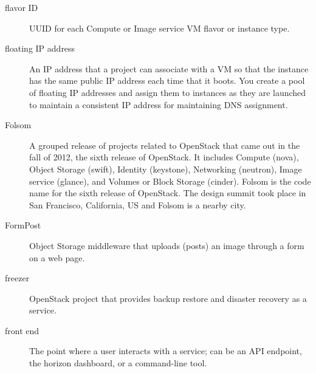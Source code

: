 \documentclass[letterpaper,10pt,english]{sphinxmanual}
\begin{document}
\begin{description}
\item[{flavor ID}] \leavevmode{}\label{_source/glossary:term-flavor-id}
UUID for each Compute or Image service VM flavor or instance
type.

\item[{floating IP address}] \leavevmode{}\label{_source/glossary:term-floating-ip-address}
An IP address that a project can associate with a VM so that the
instance has the same public IP address each time that it boots. You
create a pool of floating IP addresses and assign them to instances as
they are launched to maintain a consistent IP address for maintaining
DNS assignment.

\item[{Folsom}] \leavevmode{}\label{_source/glossary:term-folsom}
A grouped release of projects related to OpenStack that came out
in the fall of 2012, the sixth release of OpenStack. It includes
Compute (nova), Object Storage (swift), Identity (keystone),
Networking (neutron), Image service (glance), and Volumes or Block
Storage (cinder).
Folsom is the code name for the sixth release of
OpenStack. The design summit took place in
San Francisco, California, US and Folsom is a nearby city.

\item[{FormPost}] \leavevmode{}\label{_source/glossary:term-formpost}
Object Storage middleware that uploads (posts) an image through
a form on a web page.

\item[{freezer}] \leavevmode{}\label{_source/glossary:term-freezer}
OpenStack project that provides backup restore and disaster
recovery as a service.

\item[{front end}] \leavevmode{}\label{_source/glossary:term-front-end}
The point where a user interacts with a service; can be an API
endpoint, the horizon dashboard, or a command-line tool.

\end{description}
\end{document}
